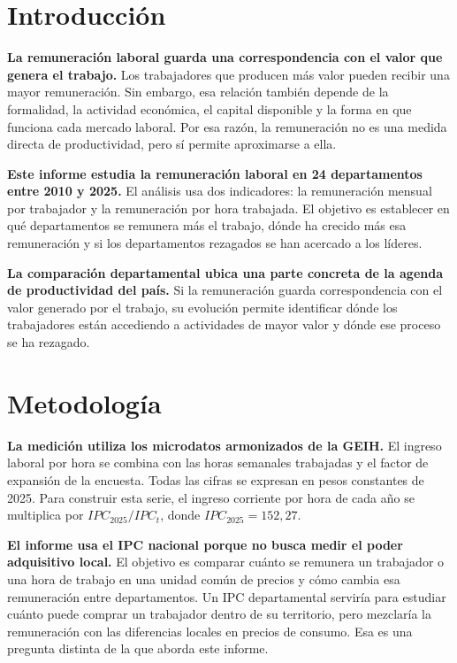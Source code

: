 \section{Introducción}

\textbf{La remuneración laboral guarda una correspondencia con el valor que genera el trabajo.} Los trabajadores que producen más valor pueden recibir una mayor remuneración. Sin embargo, esa relación también depende de la formalidad, la actividad económica, el capital disponible y la forma en que funciona cada mercado laboral. Por esa razón, la remuneración no es una medida directa de productividad, pero sí permite aproximarse a ella.

\textbf{Este informe estudia la remuneración laboral en 24 departamentos entre 2010 y 2025.} El análisis usa dos indicadores: la remuneración mensual por trabajador y la remuneración por hora trabajada. El objetivo es establecer en qué departamentos se remunera más el trabajo, dónde ha crecido más esa remuneración y si los departamentos rezagados se han acercado a los líderes.

\textbf{La comparación departamental ubica una parte concreta de la agenda de productividad del país.} Si la remuneración guarda correspondencia con el valor generado por el trabajo, su evolución permite identificar dónde los trabajadores están accediendo a actividades de mayor valor y dónde ese proceso se ha rezagado.

\section{Metodología}

\textbf{La medición utiliza los microdatos armonizados de la GEIH.} El ingreso laboral por hora se combina con las horas semanales trabajadas y el factor de expansión de la encuesta. Todas las cifras se expresan en pesos constantes de 2025. Para construir esta serie, el ingreso corriente por hora de cada año se multiplica por \(IPC_{2025}/IPC_t\), donde \(IPC_{2025}=152{,}27\).

\textbf{El informe usa el IPC nacional porque no busca medir el poder adquisitivo local.} El objetivo es comparar cuánto se remunera un trabajador o una hora de trabajo en una unidad común de precios y cómo cambia esa remuneración entre departamentos. Un IPC departamental serviría para estudiar cuánto puede comprar un trabajador dentro de su territorio, pero mezclaría la remuneración con las diferencias locales en precios de consumo. Esa es una pregunta distinta de la que aborda este informe.

